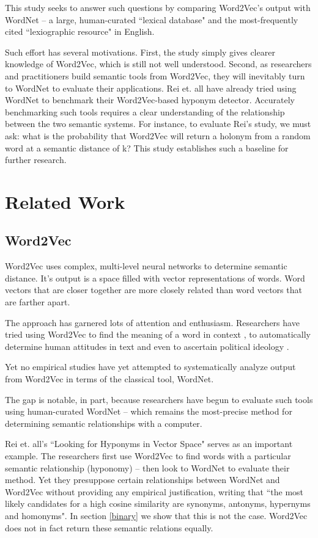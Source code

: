 \documentclass{article}
\begin{document}
This study seeks to answer such questions by comparing Word2Vec's output with WordNet -- a large, human-curated ``lexical database" \cite{Wordnetwebsite} and the most-frequently cited ``lexiographic resource" \cite{widdows} in English. 

Such effort has several motivations. First, the study simply gives clearer knowledge of Word2Vec, which is still not well understood. Second, as researchers and practitioners build semantic tools from Word2Vec, they will inevitably turn to WordNet to evaluate their applications. Rei et. all \cite{rei2014looking} have already tried using WordNet to benchmark their Word2Vec-based hyponym detector. Accurately benchmarking such tools requires a clear understanding of the relationship between the two semantic systems. For instance, to evaluate Rei's study, we must ask: what is the probability that Word2Vec will return a holonym from a random word at a semantic distance of k? This study establishes such a baseline for further research. 

\section{Related Work}

\subsection{Word2Vec}
Word2Vec uses complex, multi-level neural networks to determine semantic distance. It's output is a  space filled with vector representations of words. Word vectors that are closer together are more closely related than word vectors that are farther apart. 

The approach has garnered lots of attention and enthusiasm. Researchers have tried using Word2Vec to find the meaning of a word in context \cite{wang2014introduction}, to automatically determine human attitudes in text \cite{xue2014study} and even to ascertain political ideology \cite{iyyerpolitical}. 

Yet no empirical studies have yet attempted to systematically analyze output from Word2Vec in terms of the classical tool, WordNet. 

The gap is notable, in part, because researchers have begun to evaluate such tools using human-curated WordNet -- which remains the most-precise method for determining semantic relationships with a computer.

Rei et. all's ``Looking for Hyponyms in Vector Space" serves as an important example. \cite{rei2014looking} The researchers first use Word2Vec to find words with a particular semantic relationship (hyponomy) -- then look to WordNet to evaluate their method. Yet they presuppose certain relationships between WordNet and Word2Vec without providing any empirical justification, writing that ``the most likely candidates for a high cosine similarity are synonyms, antonyms, hypernyms and homonyms". In section \ref{binary} we show that this is not the case. Word2Vec does not in fact return these semantic relations equally. 
\end{document}
